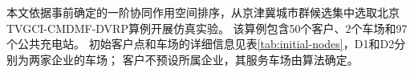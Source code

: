 \documentclass{setp-new}
\begin{document}
本文依据事前确定的一阶协同作用空间排序，从京津冀城市群候选集中选取北京TVGCI-CMDMF-DVRP算例开展仿真实验。
该算例包含50个客户、2个车场和97个公共充电站。
初始客户点和车场的详细信息见表\ref{tab:initial-nodes}，D1和D2分别为两家企业的车场；
客户不预设所属企业，其服务车场由算法确定。

\begingroup
\small
\renewcommand{\arraystretch}{0.88}
\setlength{\tabcolsep}{1.2pt}
\label{tab:initial-nodes}
\tabletail{\bottomrule}
\tablelasttail{\bottomrule}
\end{document}

